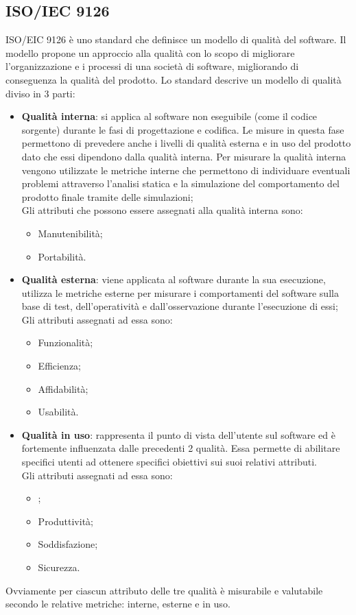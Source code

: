 \documentclass[../piano-di-qualifica.tex]{subfiles}
\begin{document}
\subsection{ISO/IEC 9126}%
\label{sec:iso/iec_9126}
ISO/EIC 9126 è uno standard che definisce un modello di qualità del software. Il modello propone un approccio alla qualità con lo scopo di migliorare l'organizzazione e i processi di una società di software, migliorando di conseguenza la qualità del prodotto.
Lo standard descrive un modello di qualità diviso in 3 parti:
\begin{itemize}
    \item \textbf{Qualità interna}: si applica al software non eseguibile (come il codice sorgente) durante le fasi di progettazione e codifica.
    Le misure in questa fase permettono di prevedere anche i livelli di qualità esterna e in uso del prodotto dato che essi dipendono dalla qualità interna.
    Per misurare la qualità interna vengono utilizzate le metriche interne che permettono di individuare eventuali problemi attraverso l'analisi statica e la simulazione del comportamento del prodotto finale tramite delle simulazioni;
    \\Gli attributi che possono essere assegnati alla qualità interna sono:
    \begin{itemize}
        \item Manutenibilità;
        \item Portabilità.
    \end{itemize}
    \item \textbf{Qualità esterna}: viene applicata al software durante la sua esecuzione, utilizza le metriche esterne per misurare i comportamenti del software sulla base di test, dell'operatività e dall'osservazione durante l'esecuzione di essi;
    \\Gli attributi assegnati ad essa sono:
    \begin{itemize}
        \item Funzionalità;
        \item Efficienza;
        \item Affidabilità;
        \item Usabilità.
    \end{itemize}
    \item \textbf{Qualità in uso}: rappresenta il punto di vista dell'utente sul software ed è fortemente influenzata dalle precedenti 2 qualità. Essa permette di abilitare specifici utenti ad ottenere specifici obiettivi sui suoi relativi attributi.
    \\Gli attributi assegnati ad essa sono:
    \begin{itemize}
        \item {};
        \item Produttività;
        \item Soddisfazione;
        \item Sicurezza.
    \end{itemize}
\end{itemize}
Ovviamente per ciascun attributo delle tre qualità è misurabile e valutabile secondo le relative metriche: interne, esterne e in uso.
\end{document}
